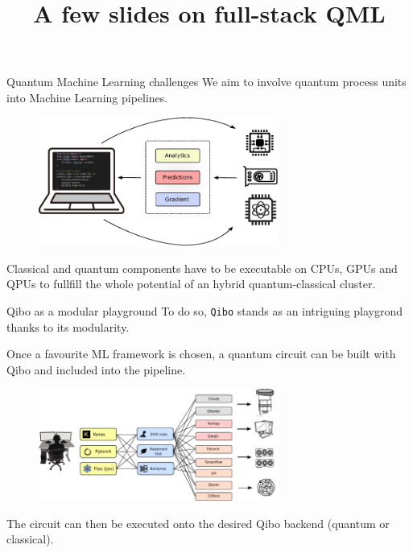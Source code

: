 \documentclass[aspectratio=169, 8pt, xcolor={svgnames}, hyperref={linkcolor=black}]{beamer}
\title{A few slides on full-stack QML}
\begin{document}
\begin{frame}
\maketitle
\end{frame}

\begin{frame}{Quantum Machine Learning challenges}
We aim to involve quantum process units into Machine Learning pipelines.
\begin{figure}
   \includegraphics[width=0.7\textwidth]{figures/hybrid.pdf}
\end{figure}
Classical and quantum components have to be executable on CPUs, GPUs and QPUs to
fullfill the whole potential of an hybrid quantum-classical cluster.
\end{frame}

\begin{frame}{Qibo as a modular playground}
To do so, \texttt{Qibo} stands as an intriguing playgrond thanks to its modularity.

Once a favourite ML framework is chosen, a quantum circuit can be built with Qibo
and included into the pipeline. 
\begin{figure}
   \includegraphics[width=0.7\textwidth]{figures/qiboml_nn_2.pdf}
\end{figure}
The circuit can then be executed onto the desired Qibo backend (quantum or classical).
\end{frame}
\end{document}
